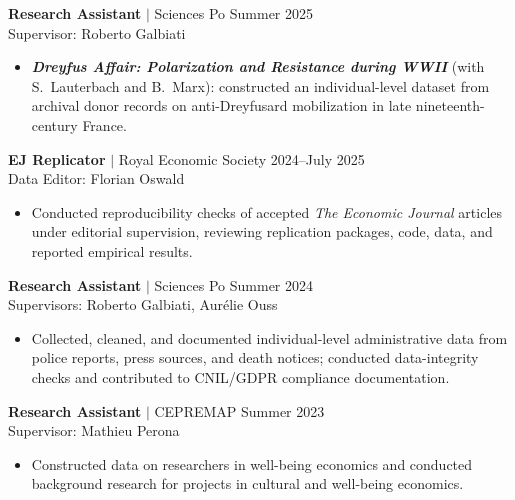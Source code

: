 \documentclass[a4paper,11pt]{article}
\begin{document}
\normalsize{\textbf{Research Assistant} $|$ Sciences Po \hfill Summer 2025 \\
Supervisor: Roberto Galbiati}
\small{\begin{itemize}[itemsep=0em, before=\vspace{-0.9em}, after=\vspace{-0.45em}]
    \item \textbf{\emph{Dreyfus Affair: Polarization and Resistance during WWII}} (with S.~Lauterbach and B.~Marx): constructed an individual-level dataset from archival donor records on anti-Dreyfusard mobilization in late nineteenth-century France.
\end{itemize}}

\normalsize{\textbf{EJ Replicator} $|$ Royal Economic Society \hfill 2024--July 2025 \\
Data Editor: Florian Oswald}
\small{\begin{itemize}[itemsep=0em, before=\vspace{-0.9em}, after=\vspace{-0.45em}]
    \item Conducted reproducibility checks of accepted \emph{The Economic Journal} articles under editorial supervision, reviewing replication packages, code, data, and reported empirical results.
\end{itemize}}

\normalsize{\textbf{Research Assistant} $|$ Sciences Po \hfill Summer 2024 \\
Supervisors: Roberto Galbiati, Aurélie Ouss}
\small{\begin{itemize}[itemsep=0em, before=\vspace{-0.9em}, after=\vspace{-0.45em}]
    \item Collected, cleaned, and documented individual-level administrative data from police reports, press sources, and death notices; conducted data-integrity checks and contributed to CNIL/GDPR compliance documentation.
\end{itemize}}

\normalsize{\textbf{Research Assistant} $|$ CEPREMAP \hfill Summer 2023 \\
Supervisor: Mathieu Perona}
\small{\begin{itemize}[itemsep=0em, before=\vspace{-0.9em}, after=\vspace{-0.45em}]
    \item Constructed data on researchers in well-being economics and conducted background research for projects in cultural and well-being economics.
\end{itemize}}
\end{document}
